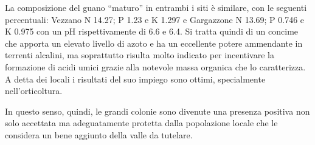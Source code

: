 {La composizione del guano ``maturo'' in entrambi i siti è similare, con le seguenti percentuali: Vezzano N 14.27; P 1.23 e K 1.297 e Gargazzone N 13.69; P 0.746 e K 0.975 con un pH rispettivamente di 6.6 e 6.4. Si tratta quindi di un concime che apporta un elevato livello di azoto e ha un eccellente potere ammendante in terrenti alcalini, ma soprattutto risulta molto indicato per incentivare la formazione di acidi umici grazie alla notevole massa organica che lo caratterizza. A detta dei locali i risultati del suo impiego sono ottimi, specialmente nell’orticoltura.

In questo senso, quindi, le grandi colonie sono divenute una presenza positiva non solo accettata ma adeguatamente protetta dalla popolazione locale che le considera un bene aggiunto della valle da tutelare.
} %
